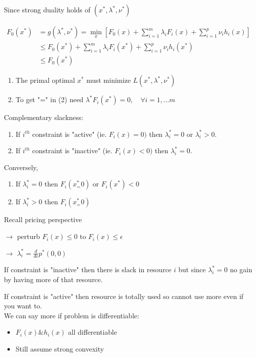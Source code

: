 Since strong duality holds of $(x^*,\lambda^*,\nu^*)$

\begin{align*}
F_0(x^*) &= g(\lambda^*,\nu^*) = \min_{x}[F_0(x)+\sum^m_{i=1}\lambda_iF_i(x) + \sum^p_{i=1}\nu_ih_i(x)]\\
&\leq F_0(x^*) +\sum^m_{i=1}\lambda_iF_i(x^*) + \sum^p_{i=1}\nu_ih_i(x^*)\\
&\leq F_0(x^*)
\end{align*}

\begin{enumerate}
	\item The primal optimal $x^*$ must minimize $L(x^*,\lambda^*,\nu^*)$
	
	\item To get "=" in (2) need $\lambda^*F_i(x^*)=0,\quad \forall i = 1,...m$
\end{enumerate}
Complementary slackness:

\begin{enumerate}
	\item If $i^{th}$ constraint is "active" (ie. $F_i(x)=0)$ then $\lambda_i^*=0$ or $\lambda_i^*>0$.
	
	\item If $i^{th}$ constraint is "inactive" (ie. $F_i(x)<0)$ then $\lambda_i^*=0$.
\end{enumerate}

Conversely,

\begin{enumerate}
	\item If $\lambda_i^*=0$ then $F_i(x^*_=0)$ or $F_i(x^*)<0$
	
	\item If $\lambda_i^*>0$ then $F_i(x^*_=0)$ 
\end{enumerate}

Recall pricing perspective

$\rightarrow$ perturb $F_i(x)\leq 0$ to $F_i(x)\leq \epsilon$

$\rightarrow$ $\lambda_i^* = \frac{d}{d\epsilon}p^*(0,0)$


If constraint is "inactive" then there is slack in resource $i$ but since $\lambda_i^* = 0$ no gain by having more of that resource.

If constraint is "active" then resource is totally used so cannot use more even if you want to.\\

We can say more if problem is differentiable:

\begin{itemize}
	\item $F_i(x)\& h_i(x)$ all differentiable
	
	\item Still assume strong convexity
\end{itemize}

